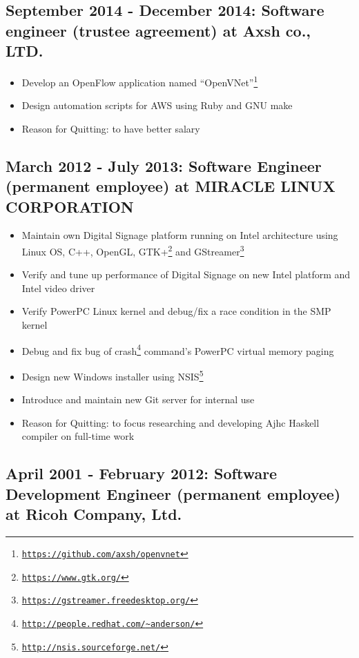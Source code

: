 \documentclass[letterpaper]{article}
\begin{document}
\subsection*{September 2014 - December 2014: Software engineer (trustee agreement) at Axsh co., LTD.}

\begin{itemize}
  \item Develop an OpenFlow application named ``OpenVNet''\footnote{\href{https://github.com/axsh/openvnet}{\tt https://github.com/axsh/openvnet}}
  \item Design automation scripts for AWS using Ruby and GNU make
  \item Reason for Quitting: to have better salary
\end{itemize}

\subsection*{March 2012 - July 2013: Software Engineer (permanent employee) at MIRACLE LINUX CORPORATION}

\begin{itemize}
  \item Maintain own Digital Signage platform running on Intel architecture using Linux OS, C++, OpenGL, GTK+\footnote{\href{https://www.gtk.org/}{\tt https://www.gtk.org/}} and GStreamer\footnote{\href{https://gstreamer.freedesktop.org/}{\tt https://gstreamer.freedesktop.org/}}
  \item Verify and tune up performance of Digital Signage on new Intel platform and Intel video driver
  \item Verify PowerPC Linux kernel and debug/fix a race condition in the SMP kernel
  \item Debug and fix bug of crash\footnote{\href{http://people.redhat.com/{\textasciitilde}anderson/}{\tt http://people.redhat.com/{\textasciitilde}anderson/}} command's PowerPC virtual memory paging
  \item Design new Windows installer using NSIS\footnote{\href{http://nsis.sourceforge.net/}{\tt http://nsis.sourceforge.net/}}
  \item Introduce and maintain new Git server for internal use
  \item Reason for Quitting: to focus researching and developing Ajhc Haskell compiler on full-time work
\end{itemize}

\subsection*{April 2001 - February 2012: Software Development Engineer (permanent employee) at Ricoh Company, Ltd.}
\end{document}
